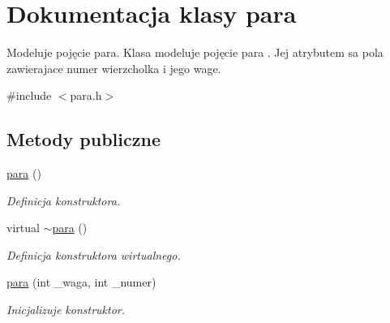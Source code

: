 \hypertarget{classpara}{\section{Dokumentacja klasy para}
\label{classpara}
}


Modeluje pojęcie para. Klasa modeluje pojęcie para . Jej atrybutem sa pola zawierajace numer wierzcholka i jego wage.  




{\ttfamily \#include $<$para.\-h$>$}

\subsection*{Metody publiczne}
\begin{DoxyCompactItemize}
\item 
\hyperlink{classpara_ad30c7566519da720cef8f4ebf68b2e48}{para} ()
\begin{DoxyCompactList}\small\item\em Definicja konstruktora. \end{DoxyCompactList}\item 
virtual \hyperlink{classpara_ab6157584ffc475598c972a6563b5e1d5}{$\sim$para} ()
\begin{DoxyCompactList}\small\item\em Definicja konstruktora wirtualnego. \end{DoxyCompactList}\item 
\hyperlink{classpara_a12765ab1f150bcd071ce65ab2fee5acf}{para} (int \-\_\-waga, int \-\_\-numer)
\begin{DoxyCompactList}\small\item\em Inicjalizuje konstruktor. \end{DoxyCompactList}\end{DoxyCompactItemize}
